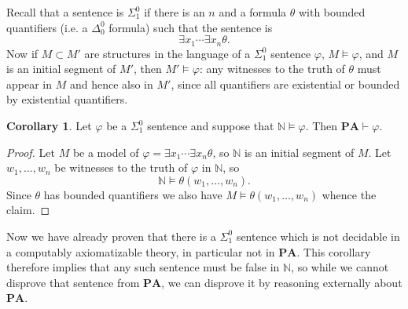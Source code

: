 \documentclass[12pt]{report}
\newcommand{\NN}{\mathbb{N}}
\newcommand{\PA}{\mathbf{PA}}
\newcommand{\proves}{\vdash}
\theoremstyle{definition}
\newtheorem{corollary}[theorem]{Corollary}
\begin{document}
Recall that a sentence is $\Sigma_1^0$ if there is an $n$ and a formula $\theta$ with bounded quantifiers (i.e. a $\Delta_0^0$ formula) such that the sentence is
$$\exists x_1 \cdots \exists x_n \theta.$$
Now if $M \subset M'$ are structures in the language of a $\Sigma_1^0$ sentence $\varphi$, $M \models \varphi$, and $M$ is an initial segment of $M'$, then $M' \models \varphi$:
any witnesses to the truth of $\theta$ must appear in $M$ and hence also in $M'$, since all quantifiers are existential or bounded by existential quantifiers.
\begin{corollary}
Let $\varphi$ be a $\Sigma_1^0$ sentence and suppose that $\NN \models \varphi$. Then $\PA \proves \varphi$.
\end{corollary}
\begin{proof}
Let $M$ be a model of $\varphi = \exists x_1 \cdots \exists x_n \theta$, so $\NN$ is an initial segment of $M$. Let $w_1, \dots, w_n$ be witnesses to the truth of $\varphi$ in $\NN$, so
$$\NN \models \theta(w_1, \dots, w_n).$$
Since $\theta$ has bounded quantifiers we also have $M \models \theta(w_1, \dots, w_n)$ whence the claim.
\end{proof}
Now we have already proven that there is a $\Sigma_1^0$ sentence which is not decidable in a computably axiomatizable theory, in particular not in $\PA$.
This corollary therefore implies that any such sentence must be false in $\NN$, so while we cannot disprove that sentence from $\PA$, we can disprove it by reasoning externally about $\PA$.
\end{document}
